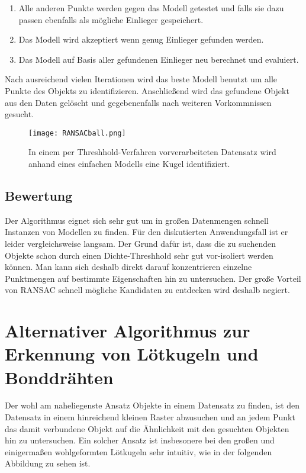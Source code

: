 \begin{enumerate}
\item Alle anderen Punkte werden gegen das Modell getestet und falls sie dazu passen ebenfalls als mögliche Einlieger gespeichert.
\item Das Modell wird akzeptiert wenn genug Einlieger gefunden werden.
\item Das Modell auf Basis aller gefundenen Einlieger neu berechnet und evaluiert.
\end{enumerate}

Nach ausreichend vielen Iterationen wird das beste Modell benutzt um alle Punkte des Objekts zu identifizieren. Anschließend wird das gefundene Objekt aus den Daten gelöscht und gegebenenfalls nach weiteren Vorkommnissen gesucht.

\begin{figure}[H]
  \begin{center}
    \texttt{[image: RANSACball.png]}
    \caption{In einem per Threshhold-Verfahren vorverarbeiteten Datensatz wird anhand eines einfachen Modells eine Kugel identifiziert.}
    \label{fig:ransac2}
  \end{center}
\end{figure}

\subsection{Bewertung}
Der Algorithmus eignet sich sehr gut um in großen Datenmengen schnell Instanzen von Modellen zu finden. Für den diskutierten Anwendungsfall ist er leider vergleichsweise langsam. Der Grund dafür ist, dass die zu suchenden Objekte schon durch einen Dichte-Threshhold sehr gut vor-isoliert werden können. Man kann sich deshalb direkt darauf konzentrieren einzelne Punktmengen auf bestimmte Eigenschaften hin zu untersuchen. Der große Vorteil von RANSAC schnell mögliche Kandidaten zu entdecken wird deshalb negiert.

\section{Alternativer Algorithmus zur Erkennung von Lötkugeln und Bonddrähten}
Der wohl am naheliegenste Ansatz Objekte in einem Datensatz zu finden, ist den Datensatz in einem hinreichend kleinen Raster abzusuchen und an jedem Punkt das damit verbundene Objekt auf die Ähnlichkeit mit den gesuchten Objekten hin zu untersuchen.
Ein solcher Ansatz ist insbesonere bei den großen und einigermaßen wohlgeformten Lötkugeln sehr intuitiv, wie in der folgenden Abbildung zu sehen ist.


